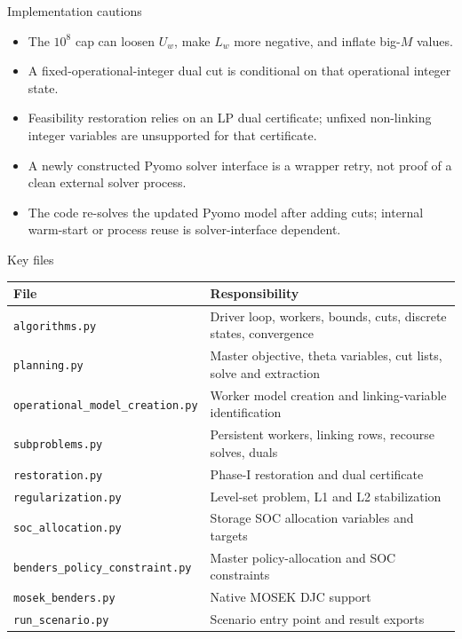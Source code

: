\documentclass[aspectratio=169,10pt]{beamer}
\begin{document}
\begin{frame}{Implementation cautions}
\begin{itemize}
\item The $10^8$ cap can loosen $U_w$, make $L_w$ more negative, and inflate big-$M$ values.
\item A fixed-operational-integer dual cut is conditional on that operational integer state.
\item Feasibility restoration relies on an LP dual certificate; unfixed non-linking integer variables are unsupported for that certificate.
\item A newly constructed Pyomo solver interface is a wrapper retry, not proof of a clean external solver process.
\item The code re-solves the updated Pyomo model after adding cuts; internal warm-start or process reuse is solver-interface dependent.
\end{itemize}
\end{frame}

\begin{frame}{Key files}
\scriptsize
\begin{tabular}{@{}p{}p{}@{}}
\toprule File & Responsibility\\\midrule
\texttt{algorithms.py} & Driver loop, workers, bounds, cuts, discrete states, convergence\\
\texttt{planning.py} & Master objective, theta variables, cut lists, solve and extraction\\
\texttt{operational\_model\_creation.py} & Worker model creation and linking-variable identification\\
\texttt{subproblems.py} & Persistent workers, linking rows, recourse solves, duals\\
\texttt{restoration.py} & Phase-I restoration and dual certificate\\
\texttt{regularization.py} & Level-set problem, L1 and L2 stabilization\\
\texttt{soc\_allocation.py} & Storage SOC allocation variables and targets\\
\texttt{benders\_policy\_constraint.py} & Master policy-allocation and SOC constraints\\
\texttt{mosek\_benders.py} & Native MOSEK DJC support\\
\texttt{run\_scenario.py} & Scenario entry point and result exports\\
\bottomrule
\end{tabular}
\end{frame}
\end{document}
